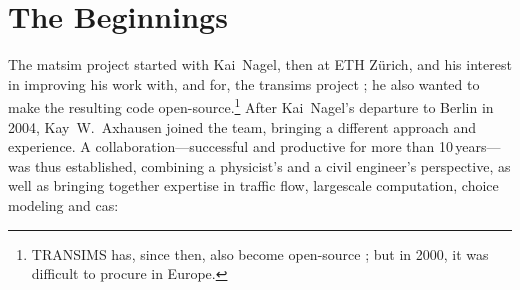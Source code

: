 \section{The Beginnings}
\label{sec:howitstarted}
The \gls{matsim} project \citep[][]{MATSIM_Webpage_2015} started with Kai~Nagel, then at ETH Zürich, and his interest in improving his work with, and for, the \gls{transims} project \citep[][]{SmithEtc1995TRANSIMSSeattle,TRANSIMSFHWA_Webpage_2013}; he also wanted to make the resulting code open-source.\footnote{%
%
TRANSIMS has, since then, also become open-source \citep{TRANSIMSOS_Webpage_2013}; but in 2000, it was difficult to procure in Europe.
%
} After Kai~Nagel's departure to Berlin in 2004, Kay~W.~Axhausen joined the team, bringing a different approach and experience. A collaboration---successful and productive for more than 10\,years---was thus established, combining a physicist's and a civil engineer's perspective, as well as  bringing together expertise in
%
traffic flow,
%
\gls{largescale} computation,
%
choice modeling
%
and
%
\gls{cas}:
%
%
%
%
%
%
%
